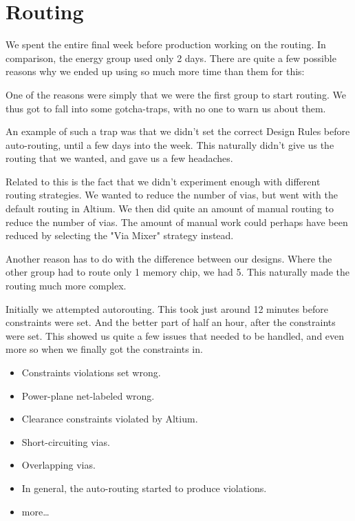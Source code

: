 \section {Routing}

We spent the entire final week before production working on the routing. In comparison, the energy group used only 2 days. There are quite a few possible reasons why we ended up using so much more time than them for this:

One of the reasons were simply that we were the first group to start routing. We thus got to fall into some gotcha-traps, with no one to warn us about them.

An example of such a trap was that we didn't set the correct Design Rules before auto-routing, until a few days into the week. This naturally didn't give us the routing that we wanted, and gave us a few headaches.

Related to this is the fact that we didn't experiment enough with different routing strategies. We wanted to reduce the number of vias, but went with the default routing in Altium. We then did quite an amount of manual routing to reduce the number of vias. The amount of manual work could perhaps have been reduced by selecting the "Via Mixer" strategy instead.


Another reason has to do with the difference between our designs. Where the other group had to route only 1 memory chip, we had 5. This naturally made the routing much more complex.

Initially we attempted autorouting. This took just around 12 minutes before constraints were set. And the better part of half an hour, after the constraints were set. This showed us quite a few issues that needed to be handled, and even more so when we finally got the constraints in.

\begin{itemize}
\item Constraints violations set wrong.
\item Power-plane net-labeled wrong.
\item Clearance constraints violated by Altium.
\item Short-circuiting vias.
\item Overlapping vias.
\item In general, the auto-routing started to produce violations.
\item more\ldots
\end{itemize}

